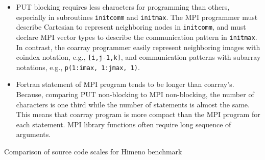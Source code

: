 \begin{itemize}
\item
PUT blocking requires less characters for programming than others,
especially in subroutines {\tt initcomm} and {\tt initmax}.
The MPI programmer must describe Cartesian 
to represent neighboring nodes in {\tt initcomm}, and must declare 
MPI vector types to describe the communication pattern in {\tt initmax}.
In contrast, the coarray programmer easily represent 
neighboring images with coindex notation, e.g., {\tt [i,j-1,k]}, and 
communication patterns with subarray notations, e.g., {\tt p(1:imax, 1:jmax, 1)}.

\item
Fortran statement of MPI program tends to be longer than coarray's.
Because, comparing PUT non-blocking to MPI non-blocking,
the number of characters is one third while the number of statements is almost the same.
This means that coarray program is more compact than the MPI program for each
statement. MPI library functions often require long sequence of arguments.

\end{itemize}


\begin{table}
 \caption{Comparison of source code scales for Himeno benchmark}\label{tab:himeno-lines}
 \begin{center}
  
 \end{center}
\end{table}





